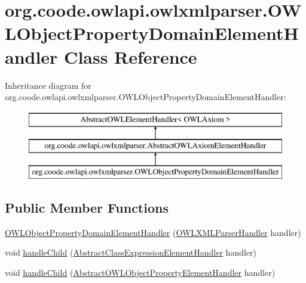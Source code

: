 \hypertarget{classorg_1_1coode_1_1owlapi_1_1owlxmlparser_1_1_o_w_l_object_property_domain_element_handler}{\section{org.\-coode.\-owlapi.\-owlxmlparser.\-O\-W\-L\-Object\-Property\-Domain\-Element\-Handler Class Reference}
\label{classorg_1_1coode_1_1owlapi_1_1owlxmlparser_1_1_o_w_l_object_property_domain_element_handler}
}
Inheritance diagram for org.\-coode.\-owlapi.\-owlxmlparser.\-O\-W\-L\-Object\-Property\-Domain\-Element\-Handler\-:\begin{figure}[H]
\begin{center}
\leavevmode
\includegraphics[height=3.000000cm]{classorg_1_1coode_1_1owlapi_1_1owlxmlparser_1_1_o_w_l_object_property_domain_element_handler}
\end{center}
\end{figure}
\subsection*{Public Member Functions}
\begin{DoxyCompactItemize}
\item 
\hyperlink{classorg_1_1coode_1_1owlapi_1_1owlxmlparser_1_1_o_w_l_object_property_domain_element_handler_a77b2409a2466805f04ba6786207b2515}{O\-W\-L\-Object\-Property\-Domain\-Element\-Handler} (\hyperlink{classorg_1_1coode_1_1owlapi_1_1owlxmlparser_1_1_o_w_l_x_m_l_parser_handler}{O\-W\-L\-X\-M\-L\-Parser\-Handler} handler)
\item 
void \hyperlink{classorg_1_1coode_1_1owlapi_1_1owlxmlparser_1_1_o_w_l_object_property_domain_element_handler_ade58a8e925b7181c14d1f242c9093933}{handle\-Child} (\hyperlink{classorg_1_1coode_1_1owlapi_1_1owlxmlparser_1_1_abstract_class_expression_element_handler}{Abstract\-Class\-Expression\-Element\-Handler} handler)
\item 
void \hyperlink{classorg_1_1coode_1_1owlapi_1_1owlxmlparser_1_1_o_w_l_object_property_domain_element_handler_a0d0013b06c99ca34b37d78497d5992b1}{handle\-Child} (\hyperlink{classorg_1_1coode_1_1owlapi_1_1owlxmlparser_1_1_abstract_o_w_l_object_property_element_handler}{Abstract\-O\-W\-L\-Object\-Property\-Element\-Handler} handler)
\end{DoxyCompactItemize}
